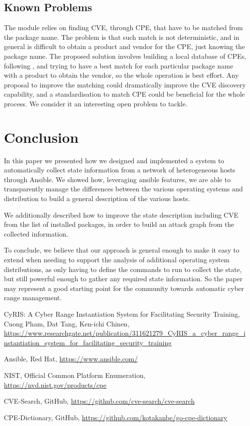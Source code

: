 \documentclass[11pt]{article}
\begin{document}
\subsection{Known Problems}

The module relies on finding CVE, through CPE, that have to be matched from the package name. The problem is that such match is not deterministic, and in general is difficult to obtain a product and vendor for the CPE, just knowing the package name. The proposed solution involves building a local database of CPEs, following \cite{cpedb}, and trying to have a best match for each particular package name with a product to obtain the vendor, so the whole operation is best effort. Any proposal to improve the matching could dramatically improve the CVE discovery capability, and a standardisation to match CPE could be beneficial for the whole process. We consider it an interesting open problem to tackle. 


\section{Conclusion}

In this paper we presented how we designed and implemented a system to automatically collect state information from a network of heterogeneous hosts through Ansible. We showed how, leveraging ansible features, we are able to transparently manage the differences between the various operating systems and distribution to build a general description of the various hosts. 

We additionally described how to improve the state description including CVE from the list of installed packages, in order to build an attack graph from the collected information. 

To conclude, we believe that our approach is general enough to make it easy to extend when needing to support the analysis of additional operating system distributions, as only having to define the commands to run to collect the state, but still powerful enough to gather any required state information. So the paper may represent a good starting point for the community towards automatic cyber range management. 


 
\begin{thebibliography}{99}
		CyRIS: A Cyber Range Instantiation System for Facilitating Security Training,
		Cuong Pham, Dat Tang, Ken-ichi Chinen,
		\url{https://www.researchgate.net/publication/311621279_CyRIS_a_cyber_range_instantiation_system_for_facilitating_security_training}
		
		Ansible,
		Red Hat,
		\url{https://www.ansible.com/}
		
		NIST,
		Official Common Platform Enumeration,
		\url{https://nvd.nist.gov/products/cpe}

		CVE-Search,
		GitHub,
		\url{https://github.com/cve-search/cve-search}
		
		CPE-Dictionary,
		GitHub,
		\url{https://github.com/kotakanbe/go-cpe-dictionary}
		
\end{thebibliography}
\end{document}
